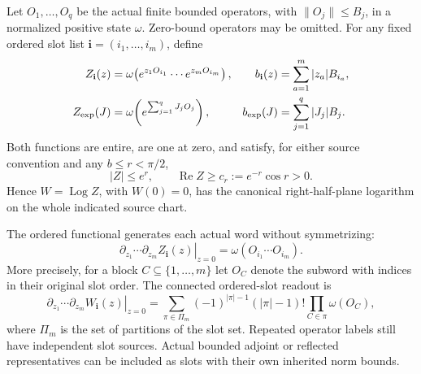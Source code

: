 \documentclass[12pt,a4paper]{article}
\begin{document}
\begin{theorem}
\label{p12:thm:v256-bounded-ordered-source}
Let $O_1,\ldots,O_q$ be the actual finite bounded operators, with
$\|O_j\|\le B_j$, in a normalized positive state $\omega$.
Zero-bound operators may be omitted.  For any fixed ordered slot list
$\mathbf i=(i_1,\ldots,i_m)$, define
\begin{align*}
 Z_{\mathbf i}(z)
 &=\omega\!\left(e^{z_1O_{i_1}}\cdots e^{z_mO_{i_m}}\right),&
 b_{\mathbf i}(z)&=\sum_{a=1}^m|z_a|B_{i_a},\\
 Z_{\rm exp}(J)
 &=\omega\!\left(e^{\sum_{j=1}^qJ_jO_j}\right),&
 b_{\rm exp}(J)&=\sum_{j=1}^q|J_j|B_j.
\end{align*}
Both functions are entire, are one at zero, and satisfy, for either
source convention and any $b\le r<\pi/2$,
\begin{equation}
 |Z|\le e^r,\qquad
 \operatorname{Re}Z\ge c_r:=e^{-r}\cos r>0.
 \label{p12:eq:v256-ordered-source-half-plane}
\end{equation}
Hence $W=\operatorname{Log}Z$, with $W(0)=0$, has the canonical
right-half-plane logarithm on the whole indicated source chart.

The ordered functional generates each actual word without symmetrizing:
\begin{equation}
 \left.\partial_{z_1}\cdots\partial_{z_m}
 Z_{\mathbf i}(z)\right|_{z=0}
 =\omega(O_{i_1}\cdots O_{i_m}).
 \label{p12:eq:v256-ordered-slot-words}
\end{equation}
More precisely, for a block $C\subseteq\{1,\ldots,m\}$ let
$O_C$ denote the subword with indices in their original slot order.
The connected ordered-slot readout is
\begin{equation}
 \left.\partial_{z_1}\cdots\partial_{z_m}
 W_{\mathbf i}(z)\right|_{z=0}
 =\sum_{\pi\in\Pi_m}(-1)^{|\pi|-1}(|\pi|-1)!
       \prod_{C\in\pi}\omega(O_C),
 \label{p12:eq:v256-ordered-slot-connected}
\end{equation}
where $\Pi_m$ is the set of partitions of the slot set.
Repeated operator labels still have independent slot sources.  Actual
bounded adjoint or reflected representatives can be included as slots
with their own inherited norm bounds.
\end{theorem}
\end{document}
